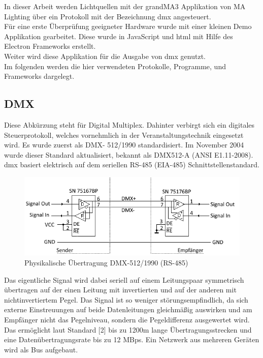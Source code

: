 \documentclass[11pt]{scrartcl}
\begin{document}
In dieser Arbeit werden Lichtquellen mit der grandMA3 Applikation von MA Lighting über ein Protokoll
mit der Bezeichnung \ac{dmx} angesteuert.\\
Für eine erste Überprüfung geeigneter Hardware wurde mit einer kleinen Demo Applikation gearbeitet. Diese wurde
in JavaScript und \ac{html} mit Hilfe des Electron Frameworks erstellt.\\
Weiter wird diese Applikation für die Ausgabe von \ac{dmx} genutzt.\\
Im folgenden werden die hier verwendeten Protokolle, Programme, und Frameworks dargelegt.

\subsection{DMX}
Diese Abkürzung steht für Digital Multiplex. Dahinter verbirgt sich ein digitales Steuerprotokoll,
welches vornehmlich in der Veranstaltungstechnik eingesetzt wird. Es wurde zuerst als DMX-
512/1990 standardisiert. Im November 2004 wurde dieser Standard aktualisiert, bekannt als
DMX512-A (ANSI E1.11-2008). \ac{dmx} basiert elektrisch auf dem seriellen RS-485 (EIA-485)
Schnittstellenstandard.\\
\begin{figure}[H]
    \includegraphics[width=\textwidth]{images/dmx.png}
    \caption{Physikalische Übertragung DMX-512/1990 (RS-485)}
\end{figure}
\noindent
Das eigentliche Signal wird dabei seriell auf einem Leitungspaar symmetrisch übertragen auf der
einen Leitung mit invertierten und auf der anderen mit nichtinvertiertem Pegel. Das Signal ist so
weniger störungsempfindlich, da sich externe Einstreuungen auf beide Datenleitungen gleichmäßig
auswirken und am Empfänger nicht das Pegelniveau, sondern die Pegeldifferenz ausgewertet wird.
Das ermöglicht laut Standard [2] bis zu 1200m lange Übertragungsstrecken und eine
Datenübertragungsrate bis zu 12 \ac{MBps}. Ein Netzwerk aus mehreren Geräten wird als Bus aufgebaut.\\
\end{document}
